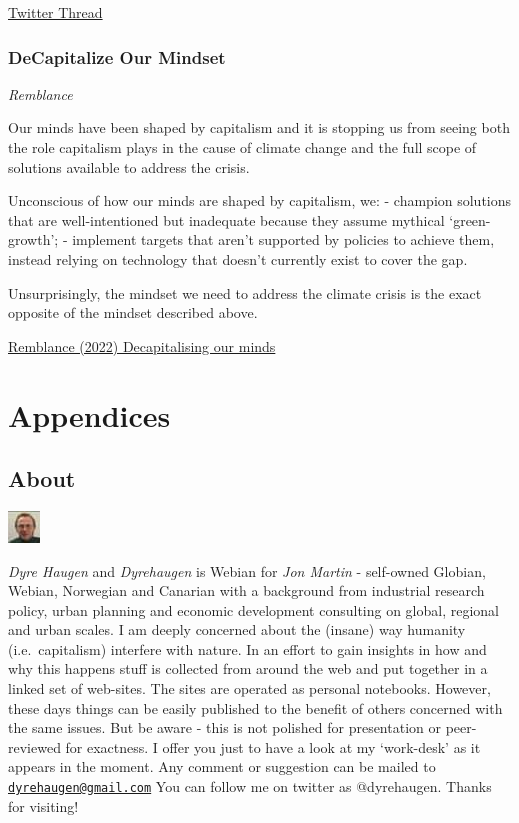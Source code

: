 \documentclass[
]{book}
\begin{document}
\href{https://twitter.com/bookcheekite/status/1460860305270001665}{Twitter Thread}

\hypertarget{decapitalize-our-mindset}{%
\section{DeCapitalize Our Mindset}\label{decapitalize-our-mindset}}

\emph{Remblance}

Our minds have been shaped by capitalism and it is stopping us from seeing both the role capitalism plays in the cause of climate change and the full scope of solutions available to address the crisis.

Unconscious of how our minds are shaped by capitalism, we:
- champion solutions that are well-intentioned but inadequate because they assume mythical `green-growth';
- implement targets that aren't supported by policies to achieve them, instead relying on technology that doesn't currently exist to cover the gap.

Unsurprisingly, the mindset we need to address the climate crisis is the exact opposite of the mindset described above.

\href{https://illuminem.com/energyvoices/3917163d-b16b-40e0-a63d-44e4b6bb4094}{Remblance (2022) Decapitalising our minds}

\hypertarget{part-appendices}{%
\part{Appendices}\label{part-appendices}}

\hypertarget{appendix-appendices}{%
\appendix}


\hypertarget{about}{%
\chapter{About}\label{about}}

\includegraphics{fig/me.jpg}

\emph{Dyre Haugen} and \emph{Dyrehaugen} is Webian for \emph{Jon Martin} -
self-owned Globian, Webian, Norwegian and Canarian with
a background from industrial research policy, urban planning and
economic development consulting on global, regional and urban scales.
I am deeply concerned about the (insane) way
humanity (i.e.~capitalism) interfere with nature.
In an effort to gain insights in how and why this happens
stuff is collected from around the web and put together
in a linked set of web-sites.
The sites are operated as personal notebooks.
However, these days things can be easily published to the
benefit of others concerned with the same issues.
But be aware - this is not polished for presentation or
peer-reviewed for exactness.
I offer you just to have a look at my `work-desk' as it appears in the moment.
Any comment or suggestion can be mailed to \href{mailto:dyrehaugen@gmail.com}{\nolinkurl{dyrehaugen@gmail.com}}
You can follow me on twitter as @dyrehaugen.
Thanks for visiting!
\end{document}
